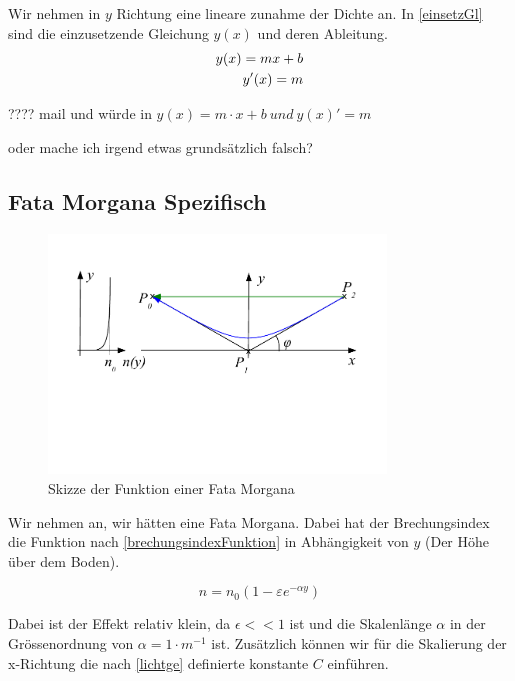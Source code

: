 Wir nehmen in $y$ Richtung eine lineare zunahme der Dichte an. In \eqref{einsetzGl} sind die einzusetzende Gleichung $y(x)$ und deren Ableitung.
\begin{align}
	y(x)=mx+b \notag \\
	y'(x)=m
	\label{einsetzGl}
\end{align}

???? mail und würde in $y(x) = m\cdot x + b \ und \ y(x)' = m$

oder mache ich irgend etwas grundsätzlich falsch?


\subsection{Fata Morgana Spezifisch}

\begin{figure}[H]
	\includegraphics[width=0.8\textwidth]{./picture/FataMorgana.pdf}
	\caption{Skizze der Funktion einer Fata Morgana}
	\label{Ab:fata}
\end{figure}


Wir nehmen an, wir hätten eine Fata Morgana. 
Dabei hat der Brechungsindex die Funktion nach \eqref{brechungsindexFunktion} in Abhängigkeit von $y$ 
(Der Höhe über dem Boden).

\begin{equation}
	n = n_0 (1 - \varepsilon e^{- \alpha y})
	\label{brechungsindexFunktion}
\end{equation}

Dabei ist der Effekt relativ klein, da $\epsilon << 1$ ist und 
die Skalenlänge $\alpha$ in der Grössenordnung von $\alpha = 1 \cdot m^{-1}$ ist.
Zusätzlich können wir für die Skalierung der x-Richtung die nach \eqref{lichtge} definierte konstante $C$ einführen.

